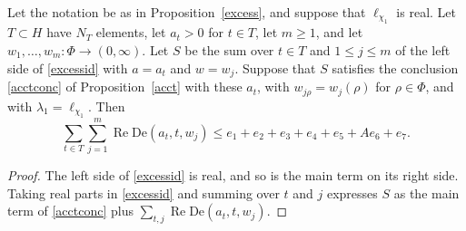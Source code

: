 \begin{corollary}\label{acctexcess}
Let the notation be as in Proposition~\ref{excess}, and suppose that $\ell_{\chi_1}$ is real. Let $T\subset H$ have $N_T$ elements, let $a_t>0$ for $t\in T$, let $m\ge1$, and let $w_1,\dots,w_m\colon\Phi\to(0,\infty)$. Let $S$ be the sum over $t\in T$ and $1\le j\le m$ of the left side of \eqref{excessid} with $a=a_t$ and $w=w_j$. Suppose that $S$ satisfies the conclusion \eqref{acctconc} of Proposition~\ref{acct} with these $a_t$, with $w_{j\rho}=w_j(\rho)$ for $\rho\in\Phi$, and with $\lambda_1=\ell_{\chi_1}$. Then
\[
\sum_{t\in T}\sum_{j=1}^m\operatorname{Re}\mathrm{De}(a_t,t,w_j)\le e_1+e_2+e_3+e_4+e_5+Ae_6+e_7 .
\]
\end{corollary}

\begin{proof}
The left side of \eqref{excessid} is real, and so is the main term on its right side. Taking real parts in \eqref{excessid} and summing over $t$ and $j$ expresses $S$ as the main term of \eqref{acctconc} plus $\sum_{t,j}\operatorname{Re}\mathrm{De}(a_t,t,w_j)$.
\end{proof}
